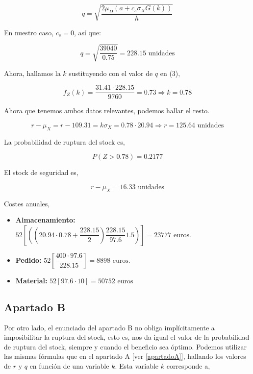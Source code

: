 \documentclass[a4paper,12pt]{article}
\begin{document}
$$ q = \sqrt{\dfrac{2\mu_D(a + c_s \sigma_X G(k))}{h}}$$

En nuestro caso, $c_s = 0$, as\'i que:

$$ q = \sqrt{\dfrac{39040}{0.75}} = 228.15 \text{ unidades}$$

Ahora, hallamos la $k$ sustituyendo con el valor de $q$ en (3),

$$ f_Z(k) = \dfrac{31.41\cdot 228.15}{9760} = 0.73 \Rightarrow k = 0.78$$

Ahora que tenemos ambos datos relevantes, podemos hallar el resto.

$$r - \mu_X = r - 109.31 = k\sigma_X = 0.78\cdot 20.94 \Rightarrow r = 125.64\text{ unidades}$$ 

La probabilidad de ruptura del stock es,

$$ P(Z > 0.78) = 0.2177$$

El stock de seguridad es,

$$ r - \mu_X = 16.33 \text{ unidades}$$

Costes anuales,
\begin{itemize}

\item[] \textbf{Almacenamiento:} $52\left[ ((20.94\cdot 0.78 + \dfrac{228.15}{2})\dfrac{228.15}{97.6} 1.5) \right] = 23777 \text{ euros.}$\\[.5cm]
\item[] \textbf{Pedido:} $52\left[ \dfrac{400\cdot 97.6}{228.15}\right] = 8898 \text{ euros.}$\\
\item[] \textbf{Material:} $52\left[ 97.6\cdot 10 \right] = 50752\text{ euros}$\\

\end{itemize}


\pagebreak

\subsection{Apartado B}


Por otro lado, el enunciado del apartado B no obliga impl\'icitamente a imposibilitar la ruptura del stock, esto es, nos da igual el valor de la probabilidad de ruptura del stock, siempre y cuando el beneficio sea \'optimo. Podemos utilizar las mismas f\'ormulas que en el apartado A [ver \ref{apartadoA}], hallando los valores de $r$ y $q$ en funci\'on de una variable $k$. Esta variable $k$ corresponde a,
\end{document}
